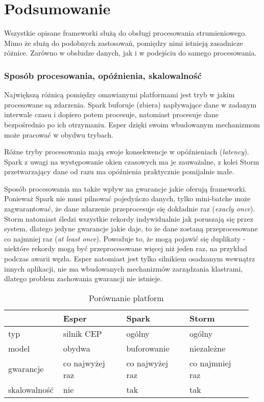 \section{Podsumowanie}

Wszystkie opisane frameworki służą do obsługi procesowania strumieniowego.
Mimo że służą do podobnych zastosowań,
pomiędzy nimi istnieją zasadnicze różnice.
Zarówno w obsłudze danych,
jak i w podejściu do samego procesowania.

\subsubsection*{Sposób procesowania, opóźnienia, skalowalność}
Największą różnicą pomiędzy omawianymi platformami jest tryb w jakim procesowane są zdarzenia.
Spark buforuje (zbiera) napływające dane w zadanym interwale czasu i dopiero potem procesuje,
natomiast procesuje dane bezpośrednio po ich otrzymaniu.
Esper dzięki swoim wbudowanym mechanizmom może pracować w obydwu trybach.

Różne tryby procesowania mają swoje konsekwencje w opóźnieniach (\textit{latency}).
Spark z uwagi na występowanie okien czasowych ma je zauważalne,
z kolei Storm przetwarzający dane od razu ma opóźnienia praktycznie pomijalnie małe.

Sposób procesowania ma także wpływ na gwarancje jakie oferują frameworki.
Ponieważ Spark nie musi pilnować pojedyńczo danych,
tylko mini-batche może zagwarantować,
że dane zdarzenie przeprocesuje się dokładnie raz (\textit{exacly once}).
Storm natomiast śledzi wszystkie rekordy indywidualnie jak poruszają się przez system,
dlatego jedyne gwarancje jakie daje,
to że dane zostaną przeprocesowane co najmniej raz (\textit{at least once}).
Powoduje to, że mogą pojawić się duplikaty - niektóre rekordy mogą być przeprocesowane więcej niż jeden raz,
na przykład podczas awarii węzła.
Esper natomiast jest tylko silnikiem osadzanym wewnątrz innych aplikacji,
nie ma wbudowanych mechanizmów zarządzania klastrami,
dlatego problem zachowania gwarancji nie istnieje.
\begin{table}[h]
  \label{tab:ModelComparison}
  \begin{tabular}{p{0.2\linewidth} p{0.25\linewidth} p{0.25\linewidth} p{0.25\linewidth}}
    & Esper & Spark & Storm \\
    \hline
    typ & silnik CEP & ogólny & ogólny \\
    model & obydwa & buforowanie & niezależne \\
    gwarancje & co najwyżej raz & co najwyżej raz & co najmniej raz \\
    skalowalność & nie & tak & tak \\
  \end{tabular}
  \caption{Porównanie platform}
\end{table}

